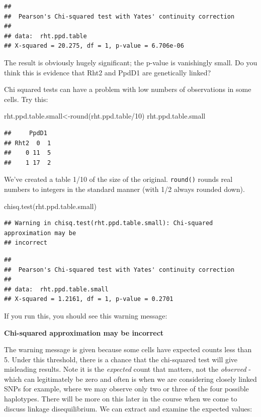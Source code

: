 \documentclass[
]{book}
\newenvironment{Shaded}{\begin{snugshade}}{\end{snugshade}}
\newcommand{\DecValTok}[1]{\textcolor[rgb]{0.00,0.00,0.81}{#1}}
\newcommand{\FunctionTok}[1]{\textcolor[rgb]{0.00,0.00,0.00}{#1}}
\newcommand{\NormalTok}[1]{#1}
\newcommand{\OtherTok}[1]{\textcolor[rgb]{0.56,0.35,0.01}{#1}}
\newcommand{\SpecialCharTok}[1]{\textcolor[rgb]{0.00,0.00,0.00}{#1}}
\begin{document}
\begin{verbatim}
## 
##  Pearson's Chi-squared test with Yates' continuity correction
## 
## data:  rht.ppd.table
## X-squared = 20.275, df = 1, p-value = 6.706e-06
\end{verbatim}

The result is obviously hugely significant; the p-value is vanishingly small. Do you think this
is evidence that Rht2 and PpdD1 are genetically linked?

Chi squared tests can have a problem with low numbers of observations in some cells. Try
this:

\begin{Shaded}
\begin{Highlighting}[]
\NormalTok{rht.ppd.table.small}\OtherTok{\textless{}{-}}\FunctionTok{round}\NormalTok{(rht.ppd.table}\SpecialCharTok{/}\DecValTok{10}\NormalTok{)}
\NormalTok{rht.ppd.table.small}
\end{Highlighting}
\end{Shaded}

\begin{verbatim}
##     PpdD1
## Rht2  0  1
##    0 11  5
##    1 17  2
\end{verbatim}

We've created a table 1/10 of the size of the original. \texttt{round()} rounds real numbers to integers in the standard manner (with 1/2 always rounded down).

\begin{Shaded}
\begin{Highlighting}[]
\FunctionTok{chisq.test}\NormalTok{(rht.ppd.table.small)}
\end{Highlighting}
\end{Shaded}

\begin{verbatim}
## Warning in chisq.test(rht.ppd.table.small): Chi-squared approximation may be
## incorrect
\end{verbatim}

\begin{verbatim}
## 
##  Pearson's Chi-squared test with Yates' continuity correction
## 
## data:  rht.ppd.table.small
## X-squared = 1.2161, df = 1, p-value = 0.2701
\end{verbatim}

If you run this, you should see this warning message:

\textbf{Chi-squared approximation may be incorrect}

The warning message is given because some cells have expected counts less than 5. Under this threshold, there is a chance that the chi-squared test will give misleading results. Note it is the \emph{expected} count that matters, not the \emph{observed} - which can legitimately be zero and often is when we are considering closely linked SNPs for example, where we may observe only two or three of the four possible haplotypes. There will be more on this later in the course when we come to discuss linkage disequilibrium. We can extract and examine the expected values:
\end{document}

